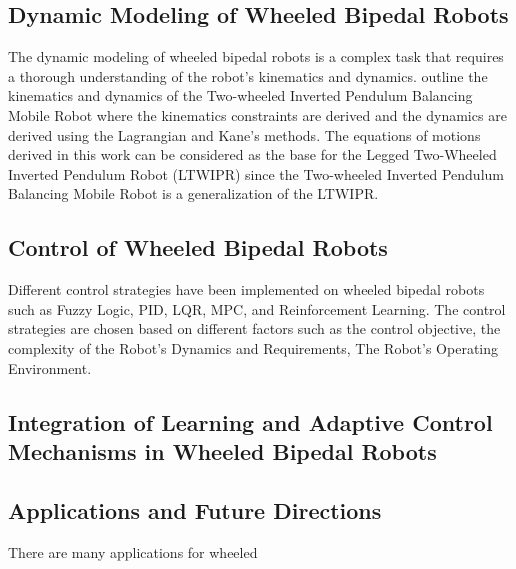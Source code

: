 \subsection{Dynamic Modeling of Wheeled Bipedal Robots}
The dynamic modeling of wheeled bipedal robots is a complex task that requires a thorough understanding of the robot's kinematics and dynamics.
 \cite{kim2015dynamic} outline the kinematics and dynamics of the Two-wheeled Inverted Pendulum Balancing
Mobile Robot where the kinematics constraints are derived and the dynamics are derived using the Lagrangian and Kane's methods. The equations of motions derived in this work can be considered as the base for the Legged Two-Wheeled Inverted Pendulum Robot (LTWIPR) since the Two-wheeled Inverted Pendulum Balancing Mobile Robot is a generalization of the LTWIPR.


\subsection{Control of Wheeled Bipedal Robots}
Different control strategies have been implemented on wheeled bipedal robots such as Fuzzy Logic, PID, LQR, MPC, and Reinforcement Learning.
The control strategies are chosen based on different factors such as the control objective, the complexity of the Robot's Dynamics and Requirements, The Robot's Operating Environment.

\subsection{Integration of Learning and Adaptive Control Mechanisms in Wheeled Bipedal Robots}

\subsection{Applications and Future Directions}
There are many applications for wheeled

